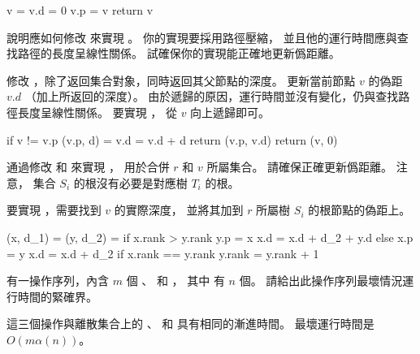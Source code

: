 \startCLRSCODE
v = 
v.d = 0
v.p = v
return v
\stopCLRSCODE
\stopANSWER

\startigBase[continue]\startitem
說明應如何修改  來實現 。
你的實現要採用路徑壓縮，
並且他的運行時間應與查找路徑的長度呈線性關係。
試確保你的實現能正確地更新僞距離。
\stopitem\stopigBase

\startANSWER
修改 ，除了返回集合對象，同時返回其父節點的深度。
更新當前節點 $v$ 的偽距 $v.d$ （加上所返回的深度）。
由於遞歸的原因，運行時間並沒有變化，仍與查找路徑長度呈線性關係。
要實現 ，
從 $v$ 向上遞歸即可。

\startCLRSCODE
if v != v.p
	(v.p, d) = 
	v.d = v.d + d
	return (v.p, v.d)
return (v, 0)
\stopCLRSCODE
\stopANSWER

\startigBase[continue]\startitem
通過修改  和  來實現 ，
用於合併 $r$ 和 $v$ 所屬集合。
請確保正確更新僞距離。
注意，
集合 $S_i$ 的根沒有必要是對應樹 $T_i$ 的根。
\stopitem\stopigBase

\startANSWER
要實現 ，需要找到 $v$ 的實際深度，
並將其加到 $r$ 所屬樹 $S_i$ 的根節點的偽距上。 

\startCLRSCODE
(x, d_1) = 
(y, d_2) = 
if x.rank > y.rank
	y.p = x
	x.d = x.d + d_2 + y.d
else
	x.p = y
	x.d = x.d + d_2
	if x.rank == y.rank
		y.rank = y.rank + 1
\stopCLRSCODE
\stopANSWER

\startigBase[continue]\startitem
有一操作序列，內含 $m$ 個 、  和 ，
其中  有 $n$ 個。
請給出此操作序列最壞情況運行時間的緊確界。
\stopitem\stopigBase

\startANSWER
這三個操作與離散集合上的 、  和  具有相同的漸進時間。
最壞運行時間是 $O(m\alpha(n))$。
\stopANSWER

\stopPROBLEM
